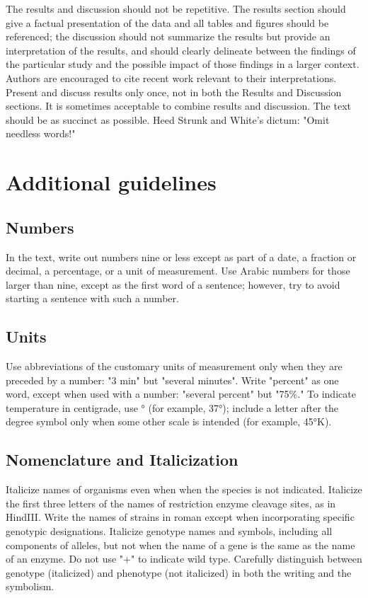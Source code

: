 \documentclass[9pt,twocolumn,twoside]{gsajnl}
\begin{document}
The results and discussion should not be repetitive. The results section should give a factual presentation of the data and all tables and figures should be referenced; the discussion should not summarize the results but provide an interpretation of the results, and should clearly delineate between the findings of the particular study and the possible impact of those findings in a larger context. Authors are encouraged to cite recent work relevant to their interpretations. Present and discuss results only once, not in both the Results and Discussion sections. It is sometimes acceptable to combine results and discussion. The text should be as succinct as possible. Heed Strunk and White's dictum: "Omit needless words!"

\section*{Additional guidelines}

\subsection*{Numbers} In the text, write out numbers nine or less except as part of a date, a fraction or decimal, a percentage, or a unit of measurement. Use Arabic numbers for those larger than nine, except as the first word of a sentence; however, try to avoid starting a sentence with such a number.

\subsection*{Units} Use abbreviations of the customary units of measurement only when they are preceded by a number: "3 min" but "several minutes". Write "percent" as one word, except when used with a number: "several percent" but "75\%." To indicate temperature in centigrade, use ° (for example, 37°); include a letter after the degree symbol only when some other scale is intended (for example, 45°K).

\subsection*{Nomenclature and Italicization} Italicize names of organisms even when  when the species is not indicated.  Italicize the first three letters of the names of restriction enzyme cleavage sites, as in HindIII. Write the names of strains in roman except when incorporating specific genotypic designations. Italicize genotype names and symbols, including all components of alleles, but not when the name of a gene is the same as the name of an enzyme. Do not use "+" to indicate wild type. Carefully distinguish between genotype (italicized) and phenotype (not italicized) in both the writing and the symbolism.
\end{document}
